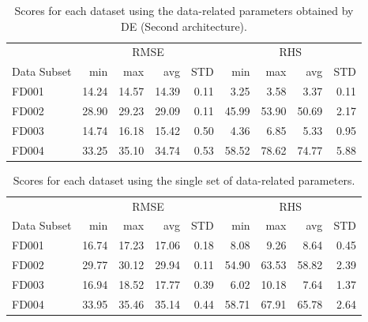 \documentclass[12pt]{IEEEtran}%
\begin{document}
\begin{table}
\begin{center}
\caption{Scores for each dataset using the data-related parameters obtained by DE (Second architecture).}%
%
\begin{tabular}
[c]{l|rrrr|rrrr}\hline
& \multicolumn{4}{|c}{RMSE} & \multicolumn{4}{|c}{RHS}\\
Data Subset & min & max & avg & STD & min & max & avg & STD\\\hline\hline
FD001 & 14.24 & 14.57 & 14.39 & 0.11 & 3.25 & 3.58 & 3.37 & 0.11\\
FD002 & 28.90 & 29.23 & 29.09 & 0.11 & 45.99 & 53.90 & 50.69 & 2.17\\
FD003 & 14.74 & 16.18 & 15.42 & 0.50 & 4.36 & 6.85 & 5.33 & 0.95\\
FD004 & 33.25 & 35.10 & 34.74 & 0.53 & 58.52 & 78.62 & 74.77 & 5.88\\\hline
\end{tabular}
\label{table:results_ann_de}%
\end{center}
\end{table}

\begin{table}
\begin{center}
\caption{Scores for each dataset using the single set of data-related parameters.}%
%
\begin{tabular}
[c]{l|rrrr|rrrr}\hline
& \multicolumn{4}{|c}{RMSE} & \multicolumn{4}{|c}{RHS}\\
Data Subset & min & max & avg & STD & min & max & avg & STD\\\hline\hline
FD001 & 16.74 & 17.23 & 17.06 & 0.18 & 8.08 & 9.26 & 8.64 & 0.45\\
FD002 & 29.77 & 30.12 & 29.94 & 0.11 & 54.90 & 63.53 & 58.82 & 2.39\\
FD003 & 16.94 & 18.52 & 17.77 & 0.39 & 6.02 & 10.18 & 7.64 & 1.37\\
FD004 & 33.95 & 35.46 & 35.14 & 0.44 & 58.71 & 67.91 & 65.78 & 2.64\\\hline
\end{tabular}
\label{table:results_ann_1}%
\end{center}
\end{table}
\end{document}
